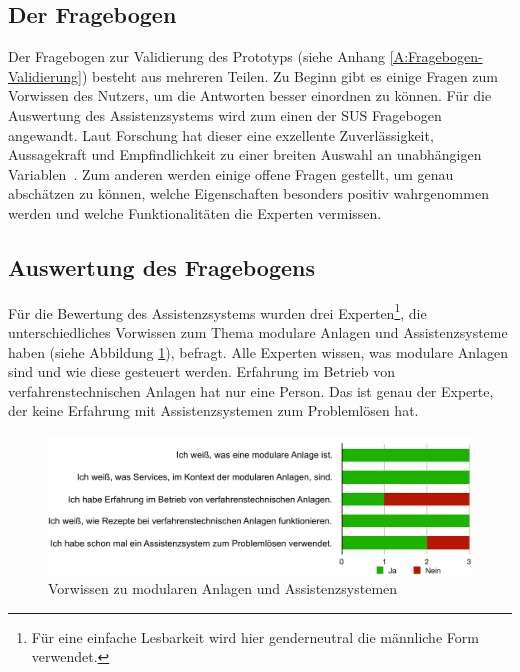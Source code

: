 \subsection{Der Fragebogen}
Der Fragebogen zur Validierung des Prototyps (siehe Anhang \ref{A:Fragebogen-Validierung}) besteht aus mehreren Teilen. Zu Beginn gibt es einige Fragen zum Vorwissen des Nutzers, um die Antworten besser einordnen zu können. Für die Auswertung des Assistenzsystems wird zum einen der SUS Fragebogen angewandt. Laut Forschung hat dieser eine \glqq exzellente Zuverlässigkeit, Aussagekraft und Empfindlichkeit zu einer breiten Auswahl an unabhängigen Variablen\grqq \ \citep[1150]{Lewis2018}. Zum anderen werden einige offene Fragen gestellt, um genau abschätzen zu können, welche Eigenschaften besonders positiv wahrgenommen werden und welche Funktionalitäten die Experten vermissen. 

\subsection{Auswertung des Fragebogens}
Für die Bewertung des Assistenzsystems wurden drei Experten\footnote{Für eine einfache Lesbarkeit wird hier genderneutral die männliche Form verwendet.}, die unterschiedliches Vorwissen zum Thema modulare Anlagen und Assistenzsysteme haben (siehe Abbildung \ref{pic:Fragebogen-Vorwissen}), befragt. Alle Experten wissen, was modulare Anlagen sind und wie diese gesteuert werden. Erfahrung im Betrieb von verfahrenstechnischen Anlagen hat nur eine Person. Das ist genau der Experte, der keine Erfahrung mit Assistenzsystemen zum Problemlösen hat.
\begin{figure}[htbp]
\centering
\includegraphics[scale=0.65]{DA_files/Bilder/Validierung/Bild-Vorwissen.pdf}
\caption{Vorwissen zu modularen Anlagen und Assistenzsystemen}
\label{pic:Fragebogen-Vorwissen}
\end{figure}

